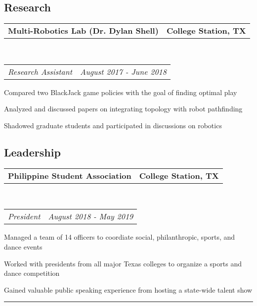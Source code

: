 \documentclass[10pt,letterpaper]{article}
\makeatletter
\newenvironment{indentsection}[1]%
{\begin{list}{}%
	{\setlength{\leftmargin}{#1}}%
	\item[]%
}
{\end{list}}
\newcommand{\headerrow}[2]
{\begin{tabular*}{\linewidth}{l@{\extracolsep{\fill}}r}
	#1 &
	#2 \\
\end{tabular*}}
\makeatother
\begin{document}
\subsection*{Research}
\begin{indentsection}{\parindent}
	\vspace{-0.4em}
	\headerrow
		{\textbf{Multi-Robotics Lab (Dr. Dylan Shell)}}
		{\textbf{College Station, TX}}
	\\
	\headerrow
		{\emph{Research Assistant}}
		{\emph{August 2017 - June 2018}}
	\begin{itemize*}
		\item Compared two BlackJack game policies with the goal of finding optimal play 
		\item Analyzed and discussed papers on integrating topology with robot pathfinding
		\item Shadowed graduate students and participated in discussions on robotics 
	\end{itemize*}
\end{indentsection}

\vspace{-1.8em}
\subsection*{Leadership}
\begin{indentsection}{\parindent}
	\vspace{-0.4em}
	\headerrow
		{\textbf{Philippine Student Association}}
		{\textbf{College Station, TX}}
		\\
	\headerrow
		{\emph{President}}
		{\emph{August 2018 - May 2019}}
	\begin{itemize*}
		\item Managed a team of 14 officers to coordiate social, philanthropic, sports, and dance events
		\item Worked with presidents from all major Texas colleges to organize a sports and dance competition 
		\item Gained valuable public speaking experience from hosting a state-wide talent show
	\end{itemize*}

\end{indentsection}
\newif\ifdraft
\draftfalse %

\ifdraft
\hrule
\vspace{-0.8em}
\end{document}
